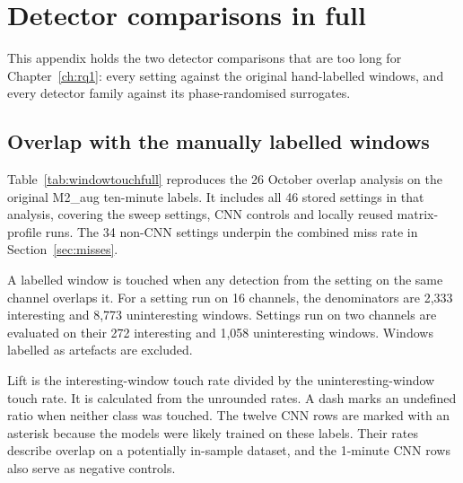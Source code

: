 \chapter{Detector comparisons in full}
\label{app:windowtouch}

This appendix holds the two detector comparisons that are too long for Chapter~\ref{ch:rq1}: every setting against the original hand-labelled windows, and every detector family against its phase-randomised surrogates.

\section*{Overlap with the manually labelled windows}

Table~\ref{tab:windowtouchfull} reproduces the 26 October overlap analysis on the original M2\_aug ten-minute labels. It includes all 46 stored settings in that analysis, covering the sweep settings, CNN controls and locally reused matrix-profile runs. The 34 non-CNN settings underpin the combined miss rate in Section~\ref{sec:misses}.

A labelled window is touched when any detection from the setting on the same channel overlaps it. For a setting run on 16 channels, the denominators are 2,333 interesting and 8,773 uninteresting windows. Settings run on two channels are evaluated on their 272 interesting and 1,058 uninteresting windows. Windows labelled as artefacts are excluded.

Lift is the interesting-window touch rate divided by the uninteresting-window touch rate. It is calculated from the unrounded rates. A dash marks an undefined ratio when neither class was touched. The twelve CNN rows are marked with an asterisk because the models were likely trained on these labels. Their rates describe overlap on a potentially in-sample dataset, and the 1-minute CNN rows also serve as negative controls.

